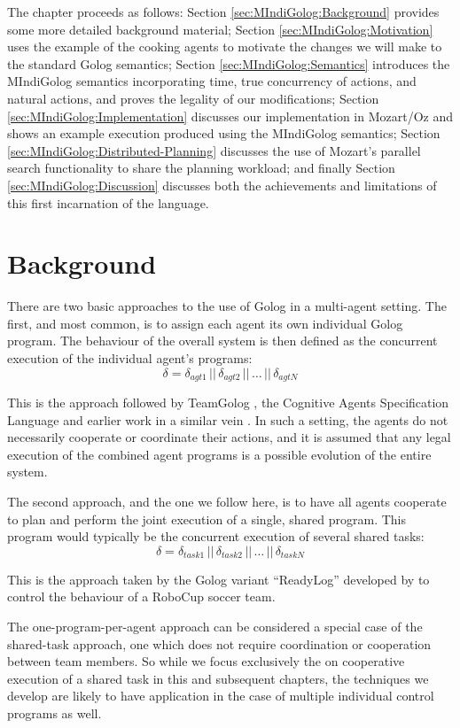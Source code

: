 The chapter proceeds as follows: Section \ref{sec:MIndiGolog:Background}
provides some more detailed background material; Section \ref{sec:MIndiGolog:Motivation}
uses the example of the cooking agents to motivate the changes we
will make to the standard Golog semantics; Section \ref{sec:MIndiGolog:Semantics}
introduces the MIndiGolog semantics incorporating time, true concurrency
of actions, and natural actions, and proves the legality of our modifications;
Section \ref{sec:MIndiGolog:Implementation} discusses our implementation
in Mozart/Oz and shows an example execution produced using the MIndiGolog
semantics; Section \ref{sec:MIndiGolog:Distributed-Planning} discusses
the use of Mozart's parallel search functionality to share the planning
workload; and finally Section \ref{sec:MIndiGolog:Discussion} discusses
both the achievements and limitations of this first incarnation of
the language.


\section{Background\label{sec:MIndiGolog:Background}}

There are two basic approaches to the use of Golog in a multi-agent
setting. The first, and most common, is to assign each agent its own
individual Golog program. The behaviour of the overall system is then
defined as the concurrent execution of the individual agent's programs:\[
\delta=\delta_{agt1}\,||\,\delta_{agt2}\,||\,\dots\,||\,\delta_{agtN}\]


This is the approach followed by TeamGolog \citep{farinelli07team_golog},
the Cognitive Agents Specification Language \citep{shapiro02casl}
and earlier work in a similar vein \citep{lesperance99modeling}.
In such a setting, the agents do not necessarily cooperate or coordinate
their actions, and it is assumed that any legal execution of the combined
agent programs is a possible evolution of the entire system.

The second approach, and the one we follow here, is to have all agents
cooperate to plan and perform the joint execution of a single, shared
program. This program would typically be the concurrent execution
of several shared tasks:\[
\delta=\delta_{task1}\,||\,\delta_{task2}\,||\,\dots\,||\,\delta_{taskN}\]


This is the approach taken by the Golog variant {}``ReadyLog'' developed
by \citet{Ferrein2005readylog} to control the behaviour of a RoboCup
soccer team.

The one-program-per-agent approach can be considered a special case
of the shared-task approach, one which does not require coordination
or cooperation between team members. So while we focus exclusively
the on cooperative execution of a shared task in this and subsequent
chapters, the techniques we develop are likely to have application
in the case of multiple individual control programs as well.

